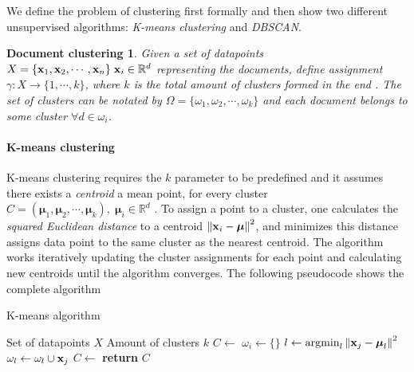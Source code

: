 We define the problem of clustering first formally and then show two different unsupervised algorithms: \emph{K-means clustering} and \emph{DBSCAN}.

\newtheorem*{docclus}{Document clustering}
\begin{docclus}
Given a set of datapoints $X = \{\mathbf{x}_1, \mathbf{x}_2, \cdots, \mathbf{x}_n\}  \; \mathbf{x}_i \in \mathbb{R}^d$ representing the documents, define assignment $\gamma: X \rightarrow \{1, \cdots, k\}$, where $k$ is the total amount of clusters formed in the end \cite{Manning:2008:IIR:1394399}. The set of clusters can be notated by $\Omega = \{\omega_1, \omega_2, \cdots, \omega_k\}$ and each document belongs to some cluster $\forall d \in \omega_i$. 
\end{docclus}

\paragraph{K-means clustering}

K-means clustering requires the $k$ parameter to be predefined and it assumes there exists a \emph{centroid} \ie a mean point, for every cluster $C = (\boldsymbol{\mu}_1, \boldsymbol{\mu}_2, \cdots, \boldsymbol{\mu}_k), \; \boldsymbol{\mu}_i \in \mathbb{R}^d$ \cite{Manning:2008:IIR:1394399}. To assign a point to a cluster, one calculates the \emph{squared Euclidean distance} to a centroid $\left\lVert\mathbf{x}_i - \boldsymbol{\mu}\right\rVert^2$, and minimizes this distance \ie assigns data point to the same cluster as the nearest centroid. The algorithm works iteratively updating the cluster assignments for each point and calculating new centroids until the algorithm converges. The following pseudocode shows the complete algorithm

\begin{algorithm}[ht]
\caption{K-means algorithm \cite{Manning:2008:IIR:1394399}}
\label{alg-kmeans}
\begin{algorithmic}

\Require Set of datapoints $X$
\Require Amount of clusters $k$
   \State $C  \leftarrow $ 
            \State $\omega_i \gets \{\} $
       \EndFor
            \State $l \gets \operatorname*{argmin}_{l} \left\lVert\mathbf{x}_j - \boldsymbol{\mu}_l\right\rVert^2$
            \State $\omega_l \gets \omega_l \cup \mathbf{x}_j$
        \EndFor
       \State $C \gets $ 
   \EndWhile
\State \textbf{return} $C$
\EndProcedure

\end{algorithmic}
\end{algorithm}

